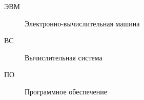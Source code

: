 \Abbreviations %
\begin{description}
    \item[ЭВМ] Электронно-вычислительная машина
    \item[ВС] Вычислительная система
    \item[ПО] Программное обеспечение
\end{description}

